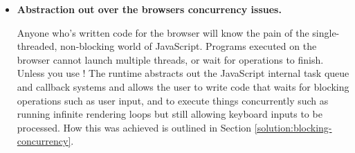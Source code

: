 \begin{itemize}
    \item \textbf{Abstraction out over the browsers concurrency issues.}
        
        Anyone who's written code for the browser will know the pain of the single-threaded, non-blocking world of JavaScript. Programs executed on the browser cannot launch multiple threads, or wait for operations to finish. Unless you use \Setanta{}! The \Setanta{} runtime abstracts out the JavaScript internal task queue and callback systems and allows the user to write code that waits for blocking operations such as user input, and to execute things concurrently such as running infinite rendering loops but still allowing keyboard inputs to be processed. How this was achieved is outlined in Section \ref{solution:blocking-concurrency}.

\end{itemize}
